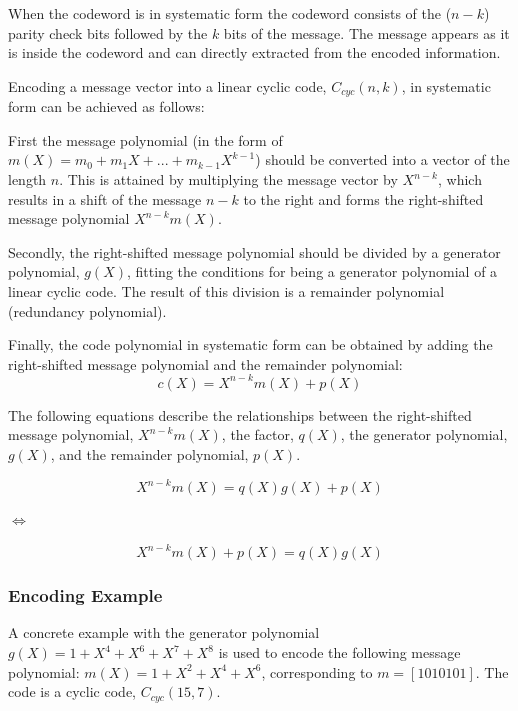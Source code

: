 \documentclass[Main]{subfiles}
\begin{document}
When the codeword is in systematic form the codeword consists of the ($n - k$) parity check bits followed by the $k$ bits of the message. The message appears as it is inside the codeword and can directly extracted from the encoded information. 

Encoding a message vector into a linear cyclic code, $C_{cyc}(n,k)$, in systematic form can be achieved as follows:

First the message polynomial (in the form of $m(X) = m_{0} + m_{1}X+...+m_{k-1}X^{k-1}$) should be converted into a vector of the length $n$. 
This is attained by multiplying the message vector by $X^{n-k}$, which results in a shift of the message $n-k$ to the right and forms the right-shifted message polynomial $X^{n-k}m(X)$.

Secondly, the right-shifted message polynomial should be divided by a generator polynomial, $g(X)$, fitting the conditions for being a generator polynomial of a linear cyclic code. 
The result of this division is a remainder polynomial (redundancy polynomial).

Finally, the code polynomial in systematic form can be obtained by adding the right-shifted message polynomial and the remainder polynomial: 
\begin{equation}
c(X) = X^{n-k}m(X)+p(X)
\label{eq:code polynomail formular}
\end{equation}

The following equations describe the relationships between the right-shifted message polynomial, $X^{n-k}m(X)$, the factor, $q(X)$, the generator polynomial, $g(X)$, and the remainder polynomial, $p(X)$.  

\begin{equation}
X^{n-k}m(X) = q(X)g(X)+p(X)
\end{equation}

$\Leftrightarrow$

\begin{equation}
X^{n-k}m(X)+p(X) = q(X)g(X)
\label{eq:encoding}
\end{equation}

\subsubsection{Encoding Example}
\noindent A concrete example with the generator polynomial $g(X)=1+X^4+X^6+X^7+X^8$ is used to encode the following message polynomial:
$m(X)=1+X^2+X^4+X^6$, corresponding to $m=[1010101]$. The code is a cyclic code, $C_{cyc}(15,7)$.
\end{document}
